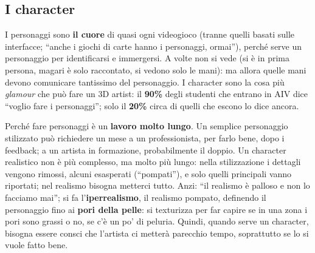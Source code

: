 \subsection{I character}

I personaggi sono \textbf{il cuore} di quasi ogni videogioco (tranne quelli
basati sulle interfacce; ``anche i giochi di carte hanno i personaggi, ormai''),
perché serve un personaggio per identificarsi e immergersi. A volte non si vede
(si è in prima persona, magari è solo raccontato, si vedono solo le mani): ma
allora quelle mani devono comunicare tantissimo del personaggio. I character
sono la cosa più \emph{glamour} che può fare un 3D artist: il \textbf{90\%}
degli studenti che entrano in AIV dice ``voglio fare i personaggi''; solo il
\textbf{20\%} circa di quelli che escono lo dice ancora.

Perché fare personaggi è un \textbf{lavoro molto lungo}. Un semplice personaggio
stilizzato può richiedere un mese a un professionista, per farlo bene, dopo i
feedback; a un artista in formazione, probabilmente il doppio. Un character
realistico non è più complesso, ma molto più lungo: nella stilizzazione i
dettagli vengono rimossi, alcuni esasperati (``pompati''), e solo quelli
principali vanno riportati; nel realismo bisogna metterci tutto. Anzi: ``il
realismo è palloso e non lo facciamo mai''; si fa l'\textbf{iperrealismo}, il
realismo pompato, definendo il personaggio fino ai \textbf{pori della pelle}:
si texturizza per far capire se in una zona i pori sono grassi o no, se c'è un
po' di peluria. Quindi, quando serve un character, bisogna essere consci che
l'artista ci metterà parecchio tempo, soprattutto se lo si vuole fatto bene.

